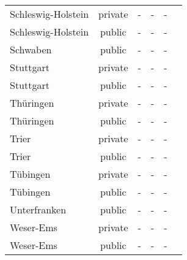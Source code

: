 \begin{table}[H]
\begin{tabularx}{\textwidth}{Xccccc}
            Schleswig-Holstein & private & - & - & - \\
            Schleswig-Holstein & public & - & - & - \\
            Schwaben & public & - & - & - \\
            Stuttgart & private & - & - & - \\
            Stuttgart & public & - & - & - \\
            Thüringen & private & - & - & - \\
            Thüringen & public & - & - & - \\
            Trier & private & - & - & - \\
            Trier & public & - & - & - \\
            Tübingen & private & - & - & - \\
            Tübingen & public & - & - & - \\
            Unterfranken & public & - & - & - \\
            Weser-Ems & private & - & - & - \\
            Weser-Ems & public & - & - & - \\
        \bottomrule
    \end{tabularx}
\end{table}
    